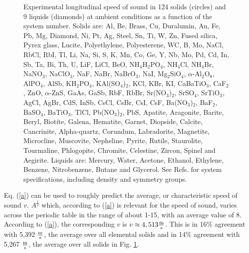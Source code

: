 \documentclass[aps,prl,groupedaddress,fleqn,twocolumn,10pt]{revtex4-1}
\begin{document}
\begin{figure}
\caption{Experimental longitudinal speed of sound \cite{handbook,handbook1,handbook2} in 124 solids (circles) and 9 liquids \cite{handbook} (diamonds) at ambient conditions as a function of the system number. Solids are: Al, Be, Brass, Cu, Duralumin, Au, Fe, Pb, Mg, Diamond, Ni, Pt, Ag, Steel, Sn, Ti, W, Zn, Fused silica, Pyrex glass, Lucite, Polyethylene, Polyesterene, WC, B, Mo, NaCl, RbCl, RbI, Tl, Li, Na, Si, S, K, Mn, Co, Ge, Y, Nb, Mo, Pd, Cd, In, Sb, Ta, Bi, Th, U, LiF, LiCl, BeO, NH$_4$H$_2$PO$_4$, NH$_4$Cl, NH$_4$Br, NaNO$_3$, NaClO$_3$, NaF, NaBr, NaBrO$_3$, NaI, Mg$_2$SiO$_4$, $\alpha$-Al$_2$O$_8$, AlPO$_4$, AlSb, KH$_2$PO$_4$, KAl(SO$_4$)$_2$, KCl, KBr, KI, CaBaTiO$_3$, CaF$_2$, ZnO, $\alpha$-ZnS, GaAs, GaSb, RbF, RbBr, Sr(NO$_3$)$_2$, SrSO$_4$, SrTiO$_3$, AgCl, AgBr, CdS, InSb, CsCl, CsBr, CsI, CsF, Ba(NO$_3$)$_2$, BaF$_2$, BaSO$_4$, BaTiO$_3$, TlCl, Pb(NO$_3$)$_2$, PbS, Apatite, Aragonite, Barite, Beryl, Biotite, Galena, Hematite, Garnet, Diopside, Calcite, Cancrinite, Alpha-quartz, Corundum, Labradorite, Magnetite, Microcline, Muscovite, Nepheline, Pyrite, Rutile, Staurolite, Tourmaline, Phlogopite, Chromite, Celestine, Zircon, Spinel and Aegirite. Liquids are: Mercury, Water, Acetone, Ethanol, Ethylene, Benzene, Nitrobenzene, Butane and Glycerol. See Refs. \cite{handbook,handbook1,handbook2} for system specifications, including density and symmetry groups.
}
\label{all}
\end{figure}

Eq. (\ref{a}) can be used to roughly predict the average, or characteristic speed of sound $v$. $A^{\frac{1}{2}}$ which, according to (\ref{a}) is relevant for the speed of sound, varies across the periodic table in the range of about 1-15, with an average value of 8. According to (\ref{a}), the corresponding $v$ is $v\approx 4,513\frac{\rm m}{\rm s}$. This is in 16\% agreement with 5,392 $\frac{\rm m}{\rm s}$, the average over all elemental solids and in 14\% agreement with 5,267 $\frac{\rm m}{\rm s}$, the average over all solids in Fig. \ref{all}.
\end{document}
